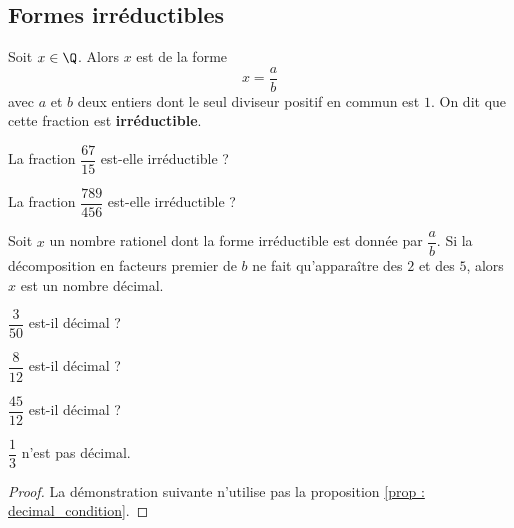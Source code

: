 \documentclass{article}
\begin{document}
\subsection{Formes irréductibles}
\begin{proposition}
Soit $x \in \Q$. Alors $x$ est de la forme
\begin{equation*}
x = \dfrac{a}{b}
\end{equation*}
avec $a$ et $b$ deux entiers dont le seul diviseur positif en commun est $1$. On dit que cette fraction est \textbf{irréductible}.
\end{proposition}
\begin{example}
\hfill
\begin{enumquestions}
\item La fraction $\dfrac{67}{15}$ est-elle irréductible ? \answersline
\item La fraction $\dfrac{789}{456}$ est-elle irréductible ? \answersline
\end{enumquestions}
\end{example}
\begin{proposition}
\label{prop : decimal_condition}
Soit $x$ un nombre rationel dont la forme irréductible est donnée par $\dfrac{a}{b}$. Si la décomposition en facteurs premier de $b$ ne fait qu'apparaître des $2$ et des $5$, alors $x$ est un nombre décimal.
\end{proposition}
\begin{example}
\hfill
\begin{enumquestions}
\item $\dfrac{3}{50}$ est-il décimal ? \answersline
\item $\dfrac{8}{12}$ est-il décimal ? \answersline
\item $\dfrac{45}{12}$ est-il décimal ? \answersline
\end{enumquestions}
\end{example}
\begin{proposition}
$\dfrac{1}{3}$ n'est pas décimal.
\end{proposition}
\begin{proof}
La démonstration suivante n'utilise pas la proposition \ref{prop : decimal_condition}.
\vspace*{0.5cm}

\emptybox{8cm}
\end{proof}
\end{document}
